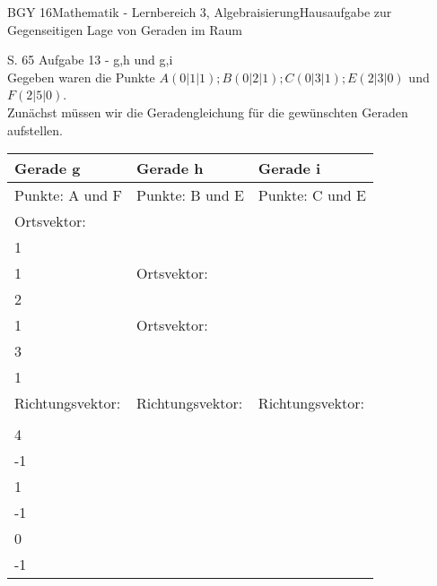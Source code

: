 \documentclass[oneside,openany,headings=optiontotoc,11pt,numbers=noenddot]{scrreprt}
\begin{document}
	\begin{worksheet}{BGY 16}{Mathematik - Lernbereich 3, Algebraisierung}{Hausaufgabe zur Gegenseitigen Lage von Geraden im Raum}
		
		\begin{framed}
			\noindent
			\tiny{\color{codegray}S. 65 Aufgabe 13 - g,h und g,i}\\
			\normalsize
			\noindent
			Gegeben waren die Punkte \(A(0|1|1); B(0|2|1); C(0|3|1); E(2|3|0)\) und \(F(2|5|0)\).\\
			Zunächst müssen wir die Geradengleichung für die gewünschten Geraden aufstellen.\\
			\begin{tabularx}{\textwidth}{X|X|X}
				Gerade g & Gerade h & Gerade i\\
				\hline
				Punkte: A und F & Punkte: B und E & Punkte: C und E\\
				Ortsvektor: \(\vec{0A} = \left(\begin{array}{c}0\\1\\1\end{array}\right)\) & Ortsvektor: \(\vec{0B} = \left(\begin{array}{c}0\\2\\1\end{array}\right)\) & Ortsvektor: \(\vec{0C} = \left(\begin{array}{c}0\\3\\1\end{array}\right)\)\\
				Richtungsvektor: & Richtungsvektor: & Richtungsvektor:\\
				\(\vec{u} = \vec{F} - \vec{A} = \left(\begin{array}{c}2\\4\\-1\end{array}\right)\) & \(\vec{u} = \vec{E} - \vec{B} = \left(\begin{array}{c}2\\1\\-1\end{array}\right)\) & \(\vec{u} = \vec{E} - \vec{C} = \left(\begin{array}{c}2\\0\\-1\end{array}\right)\)\\

\end{tabularx}
\end{framed}
\end{worksheet}
\end{document}
